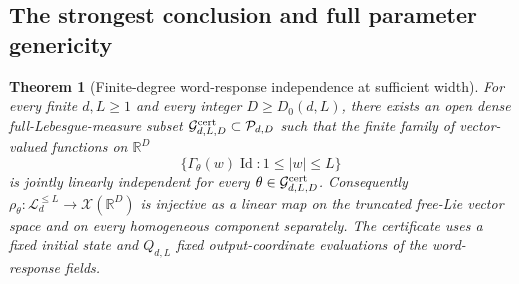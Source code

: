 \documentclass[11pt,a4paper]{article}
\numberwithin{equation}{section}
\newtheorem{theorem}{Theorem}[section]
\theoremstyle{definition}
\theoremstyle{remark}
\DeclareMathOperator{\Id}{Id}
\newcommand{\R}{\mathbb R}
\newcommand{\Lie}{\mathcal L}
\begin{document}
\subsection{The strongest conclusion and full parameter genericity}
\begin{theorem}[Finite-degree word-response independence at sufficient width]
\label{thm:width}
For every finite $d,L\geq1$ and every integer $D\geq D_0(d,L)$, there
exists an open dense full-Lebesgue-measure subset
$\mathcal G_{d,L,D}^{\rm cert}\subset\mathcal P_{d,D}$ such that the
finite family of vector-valued functions on $\R^D$
\begin{equation}\label{eq:wordfamily}
 \{\Gamma_\theta(w)\Id:1\leq|w|\leq L\}
\end{equation}
is jointly linearly independent for every
$\theta\in\mathcal G_{d,L,D}^{\rm cert}$. Consequently
$\rho_\theta:\Lie_d^{\leq L}\to\mathcal X(\R^D)$ is injective as a
linear map on the truncated free-Lie vector space and on every homogeneous
component separately. The certificate uses a fixed initial state and
$Q_{d,L}$ fixed output-coordinate evaluations of the word-response fields.
\end{theorem}
\end{document}
